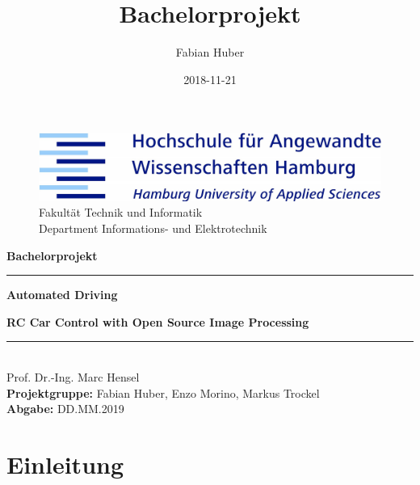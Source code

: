 \documentclass[a4paper,12pt]{article}
\title{Bachelorprojekt}
\date{2018-11-21}
\author{Fabian Huber}
\begin{document}
\begin{titlepage}
\begin{figure}[h!]
  \begin{flushright}
  \begin{spacing}{1.5}
  \includegraphics[width=.5\linewidth]{images/hawlogo.png}
  \label{fig:hawlogo}\\
  \small Fakultät Technik und Informatik\\
  \small Department Informations- und Elektrotechnik
  \end{spacing}
  \end{flushright}
\end{figure}
\textbf{\large Bachelorprojekt}
\begin{center}\noindent\textcolor{blue(ncs)}{\rule{13.5cm}{0.5mm}}\end{center}
\begin{spacing}{4.5}
\textbf{\huge Automated Driving}
\end{spacing}
\textbf{\large\indent RC Car Control with Open Source Image Processing}
\begin{center}\noindent\textcolor{blue(ncs)}{\rule{13.5cm}{0.5mm}}\end{center}
\begin{spacing}{1.15}
\vspace*{\fill}
\noindent
\textnormal{\\
  Prof. Dr.-Ing. Marc Hensel \\
  \textbf{Projektgruppe:} Fabian Huber, Enzo Morino, Markus Trockel \\
  \textbf{Abgabe:} DD.MM.2019 \\
}
\end{spacing}
\end{titlepage}

  \newpage

  \tableofcontents
  \newpage


  \section{Einleitung}
    \ \\
\end{document}
